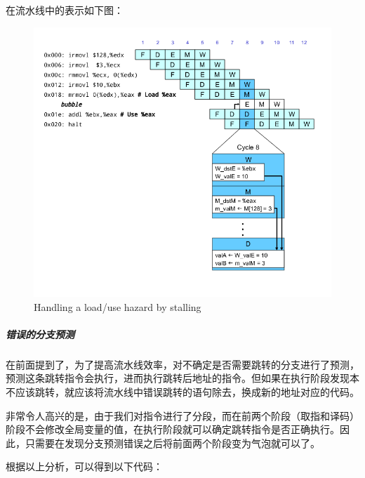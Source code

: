 \documentclass[12pt]{article}
\begin{document}
\begin{CJK*}{GB}{gbsn}
在流水线中的表示如下图：

\begin{figure}[htbp]
\centering
\includegraphics{img/prog5-stall.png}
\caption{Handling a load/use hazard by stalling}
\end{figure}

\subparagraph{错误的分支预测}\label{ux9519ux8befux7684ux5206ux652fux9884ux6d4b}

在前面提到了，为了提高流水线效率，对不确定是否需要跳转的分支进行了预测，预测这条跳转指令会执行，进而执行跳转后地址的指令。但如果在执行阶段发现本不应该跳转，就应该将流水线中错误跳转的语句除去，换成新的地址对应的代码。

非常令人高兴的是，由于我们对指令进行了分段，而在前两个阶段（取指和译码）阶段不会修改全局变量的值，在执行阶段就可以确定跳转指令是否正确执行。因此，只需要在发现分支预测错误之后将前面两个阶段变为气泡就可以了。

根据以上分析，可以得到以下代码：

\begin{Shaded}
\begin{Highlighting}[]
  \NormalTok{)&&}
                       \NormalTok{);}


\end{Highlighting}
\end{Shaded}
\end{CJK*}
\end{document}
